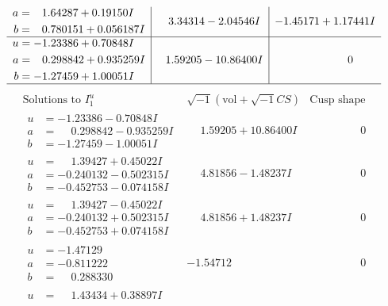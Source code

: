\documentclass[1p]{elsarticle_modified}
\theoremstyle{definition}
\newcommand{\I}{\sqrt{-1}}
\begin{document}
$$\begin{array}{c|c|c}
\begin{aligned}
a &= \phantom{-}1.64287 + 0.19150 I \\
b &= \phantom{-}0.780151 + 0.056187 I\end{aligned}
 & \phantom{-}3.34314 - 2.04546 I & -1.45171 + 1.17441 I \\ \hline\begin{aligned}
u &= -1.23386 + 0.70848 I \\
a &= \phantom{-}0.298842 + 0.935259 I \\
b &= -1.27459 + 1.00051 I\end{aligned}
 & \phantom{-}1.59205 - 10.86400 I & \phantom{-0.000000 } 0\\
 \hline 
 \end{array}$$\newpage$$\begin{array}{c|c|c}  
\text{Solutions to }I^u_{1}& \I (\text{vol} + \sqrt{-1}CS) & \text{Cusp shape}\\
 \hline 
\begin{aligned}
u &= -1.23386 - 0.70848 I \\
a &= \phantom{-}0.298842 - 0.935259 I \\
b &= -1.27459 - 1.00051 I\end{aligned}
 & \phantom{-}1.59205 + 10.86400 I & \phantom{-0.000000 } 0 \\ \hline\begin{aligned}
u &= \phantom{-}1.39427 + 0.45022 I \\
a &= -0.240132 - 0.502315 I \\
b &= -0.452753 - 0.074158 I\end{aligned}
 & \phantom{-}4.81856 - 1.48237 I & \phantom{-0.000000 } 0 \\ \hline\begin{aligned}
u &= \phantom{-}1.39427 - 0.45022 I \\
a &= -0.240132 + 0.502315 I \\
b &= -0.452753 + 0.074158 I\end{aligned}
 & \phantom{-}4.81856 + 1.48237 I & \phantom{-0.000000 } 0 \\ \hline\begin{aligned}
u &= -1.47129\phantom{ +0.000000I} \\
a &= -0.811222\phantom{ +0.000000I} \\
b &= \phantom{-}0.288330\phantom{ +0.000000I}\end{aligned}
 & -1.54712\phantom{ +0.000000I} & \phantom{-0.000000 } 0 \\ \hline\begin{aligned}
u &= \phantom{-}1.43434 + 0.38897 I \\

\end{aligned}
\end{array}$$
\end{document}

